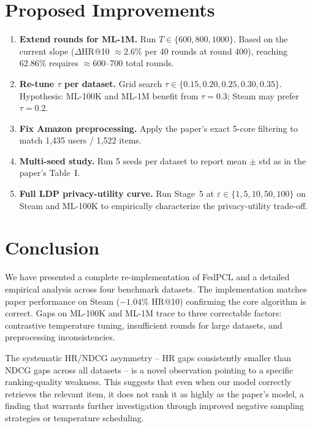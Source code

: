 \documentclass[10pt,twocolumn]{article}
\begin{document}
\section{Proposed Improvements}
\label{sec:future}

\begin{enumerate}[leftmargin=1.5em,itemsep=2pt]
  \item \textbf{Extend rounds for ML-1M.} Run $T \in \{600,800,1000\}$.
        Based on the current slope ($\Delta$HR@10 $\approx 2.6\%$ per
        40 rounds at round 400), reaching 62.86\% requires $\approx$600--700
        total rounds.

  \item \textbf{Re-tune $\tau$ per dataset.} Grid search
        $\tau \in \{0.15, 0.20, 0.25, 0.30, 0.35\}$. Hypothesis:
        ML-100K and ML-1M benefit from $\tau{=}0.3$; Steam may prefer
        $\tau{=}0.2$.

  \item \textbf{Fix Amazon preprocessing.} Apply the paper's exact
        5-core filtering to match 1,435 users / 1,522 items.

  \item \textbf{Multi-seed study.} Run 5 seeds per dataset to report
        mean $\pm$ std as in the paper's Table~I.

  \item \textbf{Full LDP privacy-utility curve.} Run Stage~5 at
        $\varepsilon \in \{1, 5, 10, 50, 100\}$ on Steam and ML-100K
        to empirically characterize the privacy-utility trade-off.
\end{enumerate}

\section{Conclusion}
\label{sec:conclusion}

We have presented a complete re-implementation of FedPCL and a detailed
empirical analysis across four benchmark datasets. The implementation
matches paper performance on Steam ($-1.04\%$ HR@10) confirming the core
algorithm is correct. Gaps on ML-100K and ML-1M trace to three
correctable factors: contrastive temperature tuning, insufficient rounds
for large datasets, and preprocessing inconsistencies.

The systematic HR/NDCG asymmetry -- HR gaps consistently smaller than
NDCG gaps across all datasets -- is a novel observation pointing to a
specific ranking-quality weakness. This suggests that even when our model
correctly retrieves the relevant item, it does not rank it as highly as
the paper's model, a finding that warrants further investigation through
improved negative sampling strategies or temperature scheduling.
\end{document}
